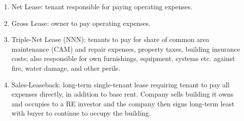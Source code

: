 \begin{remark} 
\begin{enumerate}[label=\roman*.]
\setlength{\itemsep}{0pt}
\item Net Lease: tenant responsible for paying operating expenses.
\item Gross Lease: owner to pay operating expenses.
\item Triple-Net Lease (NNN): tenants to pay for share of common area maintenance (CAM) and repair expenses, property taxes, building insurance costs; also responsible for own furnishings, equipment, systems etc. against fire, water damage, and other perils.
\item Sales-Leaseback: long-term single-tenant lease requiring tenant to pay all expenses directly, in addition to base rent. Company sells building it owns and occupies to a RE investor and the company then signs long-term least with buyer to continue to occupy the building.
\end{enumerate}
\end{remark}

